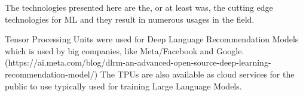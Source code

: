 The technologies presented here are the, or at least was, the cutting edge technologies for ML and
they result in numerous usages in the field. 

Tensor Processing Units were used for Deep Language Recommendation Models which is used by big companies, like Meta/Facebook and Google. (https://ai.meta.com/blog/dlrm-an-advanced-open-source-deep-learning-recommendation-model/)
The TPUs are also available as cloud services for the public to use typically used for training Large Language Models.

